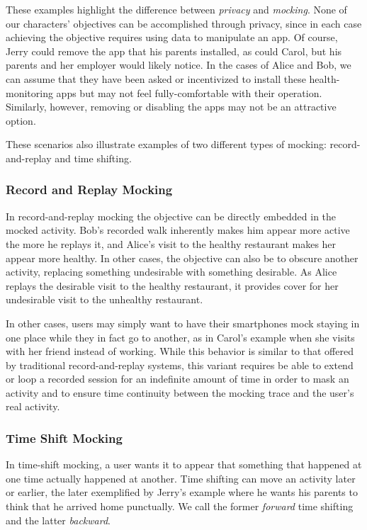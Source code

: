 These examples highlight the difference between \textit{privacy} and
\textit{mocking}. None of our characters' objectives can be accomplished
through privacy, since in each case achieving the objective requires using
data to manipulate an app. Of course, Jerry could remove the app that his
parents installed, as could Carol, but his parents and her employer would
likely notice. In the cases of Alice and Bob, we can assume that
they have been asked or incentivized to install these health-monitoring apps
but may not feel fully-comfortable with their operation. Similarly, however,
removing or disabling the apps may not be an attractive option. 

These scenarios also illustrate examples of two different types of
mocking: record-and-replay and time shifting.

\subsubsection{Record and Replay Mocking}

In record-and-replay mocking the objective can be directly embedded in the
mocked activity. Bob's recorded walk inherently makes him appear more active
the more he replays it, and Alice's visit to the healthy restaurant makes her
appear more healthy. In other cases, the objective can also be to obscure
another activity, replacing something undesirable with something desirable.
As Alice replays the desirable visit to the healthy restaurant, it provides
cover for her undesirable visit to the unhealthy restaurant.

In other cases, \PocketMocker{} users may simply want to have their smartphones
mock staying in one place while they in fact go to another, as in
Carol's example when she visits with her friend instead of working. While this
behavior is similar to that offered by traditional record-and-replay systems,
this variant requires \PocketMocker{} be able to extend or loop a recorded
session for an indefinite amount of time in order to mask an activity and to
ensure time continuity between the mocking trace and the user's real activity.

\subsubsection{Time Shift Mocking}

In time-shift mocking, a user wants it to appear that something that happened
at one time actually happened at another. Time shifting can move an activity
later or earlier, the later exemplified by Jerry's example where he wants his
parents to think that he arrived home punctually. We call the former
\textit{forward} time shifting and the latter \textit{backward}.

